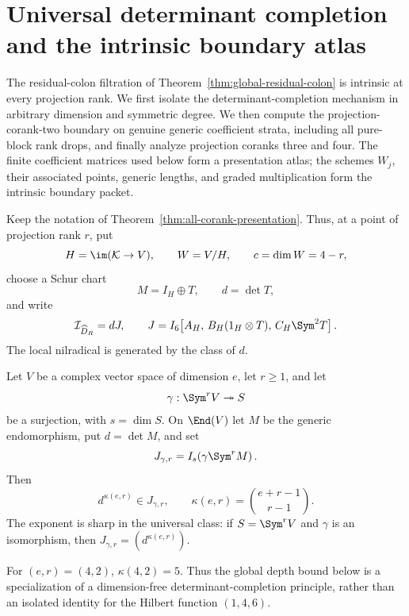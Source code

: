 \section{Universal determinant completion and the intrinsic boundary atlas}
\label{sec:boundary-atlas-statement}

The residual-colon filtration of
Theorem~\ref{thm:global-residual-colon} is intrinsic at every
projection rank.  We first isolate the determinant-completion
mechanism in arbitrary dimension and symmetric degree.  We then
compute the projection-corank-two boundary on genuine generic
coefficient strata, including all pure-block rank drops, and finally
analyze projection coranks three and four.  The finite coefficient
matrices used below form a presentation atlas; the schemes \(W_j\),
their associated points, generic lengths, and graded multiplication
form the intrinsic boundary packet.

Keep the notation of
Theorem~\ref{thm:all-corank-presentation}.  Thus, at a point of
projection rank \(r\), put
\[
 H=\im(\mathcal K\to V),\qquad W=V/H,\qquad c=\dim W=4-r,
\]
choose a Schur chart
\[
 M=I_H\oplus T,\qquad d=\det T,
\]
and write
\begin{equation}\label{eq:atlas-residual-J}
 \mathcal I_{\widehat D_R}=dJ,\qquad
 J=I_6\!\left[
 A_H,\,
 B_H(1_H\otimes T),\,
 C_H\Sym^2T
 \right].
\end{equation}
The local nilradical is generated by the class of \(d\).

\begin{theorem}
\label{thm:universal-det-completion}
Let \(V\) be a complex vector space of dimension \(e\), let
\(r\ge1\), and let
\[
 \gamma:\Sym^rV\twoheadrightarrow S
\]
be a surjection, with \(s=\dim S\).  On \(\End(V)\) let \(M\)
be the generic endomorphism, put \(d=\det M\), and set
\[
 J_{\gamma,r}=I_s\!\left(\gamma\Sym^rM\right).
\]
Then
\begin{equation}\label{eq:universal-det-completion}
 d^{\kappa(e,r)}\in J_{\gamma,r},\qquad
 \kappa(e,r)=\binom{e+r-1}{r-1}.
\end{equation}
The exponent is sharp in the universal class: if
\(S=\Sym^rV\) and \(\gamma\) is an isomorphism, then
\(J_{\gamma,r}=(d^{\kappa(e,r)})\).
\end{theorem}

For \((e,r)=(4,2)\),
\(\kappa(4,2)=5\).  Thus the global depth bound below is a
specialization of a dimension-free determinant-completion principle,
rather than an isolated identity for the Hilbert function
\((1,4,6)\).

